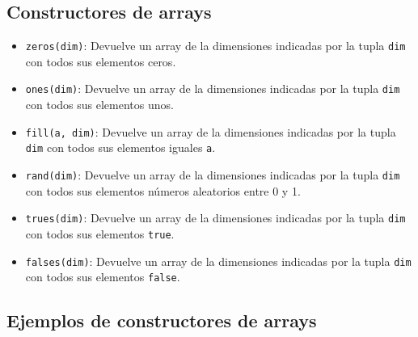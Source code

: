 \documentclass[
  letterpaper,
  DIV=11,
  numbers=noendperiod]{scrreprt}
\providecommand{\tightlist}{%
  \setlength{\itemsep}{0pt}\setlength{\parskip}{0pt}}\usepackage{longtable,booktabs,array}
\begin{document}
\hypertarget{constructores-de-arrays}{%
\subsection{Constructores de arrays}\label{constructores-de-arrays}}

\begin{itemize}
\tightlist
\item
  \texttt{zeros(dim)}: Devuelve un array de la dimensiones indicadas por
  la tupla \texttt{dim} con todos sus elementos ceros.
\item
  \texttt{ones(dim)}: Devuelve un array de la dimensiones indicadas por
  la tupla \texttt{dim} con todos sus elementos unos.
\item
  \texttt{fill(a,\ dim)}: Devuelve un array de la dimensiones indicadas
  por la tupla \texttt{dim} con todos sus elementos iguales \texttt{a}.
\item
  \texttt{rand(dim)}: Devuelve un array de la dimensiones indicadas por
  la tupla \texttt{dim} con todos sus elementos números aleatorios entre
  0 y 1.
\item
  \texttt{trues(dim)}: Devuelve un array de la dimensiones indicadas por
  la tupla \texttt{dim} con todos sus elementos \texttt{true}.
\item
  \texttt{falses(dim)}: Devuelve un array de la dimensiones indicadas
  por la tupla \texttt{dim} con todos sus elementos \texttt{false}.
\end{itemize}

\hypertarget{ejemplos-de-constructores-de-arrays}{%
\subsection{Ejemplos de constructores de
arrays}\label{ejemplos-de-constructores-de-arrays}}
\end{document}
